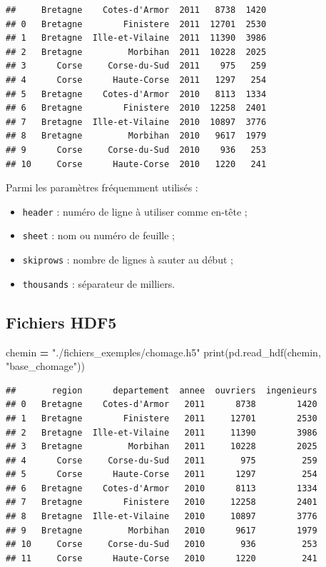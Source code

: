 \documentclass[12pt,]{book}
\newenvironment{Shaded}{\begin{snugshade}}{\end{snugshade}}
\newcommand{\StringTok}[1]{\textcolor[rgb]{0.31,0.60,0.02}{#1}}
\newcommand{\OperatorTok}[1]{\textcolor[rgb]{0.81,0.36,0.00}{\textbf{#1}}}
\newcommand{\BuiltInTok}[1]{#1}
\newcommand{\NormalTok}[1]{#1}
\providecommand{\tightlist}{%
  \setlength{\itemsep}{0pt}\setlength{\parskip}{0pt}}
\numberwithin{equation}{section}
\numberwithin{countremarque}{section}
\begin{document}
\begin{lstlisting}
##     Bretagne    Cotes-d'Armor  2011   8738  1420
## 0   Bretagne        Finistere  2011  12701  2530
## 1   Bretagne  Ille-et-Vilaine  2011  11390  3986
## 2   Bretagne         Morbihan  2011  10228  2025
## 3      Corse     Corse-du-Sud  2011    975   259
## 4      Corse      Haute-Corse  2011   1297   254
## 5   Bretagne    Cotes-d'Armor  2010   8113  1334
## 6   Bretagne        Finistere  2010  12258  2401
## 7   Bretagne  Ille-et-Vilaine  2010  10897  3776
## 8   Bretagne         Morbihan  2010   9617  1979
## 9      Corse     Corse-du-Sud  2010    936   253
## 10     Corse      Haute-Corse  2010   1220   241
\end{lstlisting}

Parmi les paramètres fréquemment utilisés :

\begin{itemize}
\tightlist
\item
  \texttt{header} : numéro de ligne à utiliser comme en-tête ;
\item
  \texttt{sheet} : nom ou numéro de feuille ;
\item
  \texttt{skiprows} : nombre de lignes à sauter au début ;
\item
  \texttt{thousands} : séparateur de milliers.
\end{itemize}

\subsection{Fichiers HDF5}\label{pandas-importation-hdf}

\begin{Shaded}
\begin{Highlighting}[]
\NormalTok{chemin }\OperatorTok{=} \StringTok{"./fichiers_exemples/chomage.h5"}
\BuiltInTok{print}\NormalTok{(pd.read_hdf(chemin, }\StringTok{"base_chomage"}\NormalTok{))}
\end{Highlighting}
\end{Shaded}

\begin{lstlisting}
##       region      departement  annee  ouvriers  ingenieurs
## 0   Bretagne    Cotes-d'Armor   2011      8738        1420
## 1   Bretagne        Finistere   2011     12701        2530
## 2   Bretagne  Ille-et-Vilaine   2011     11390        3986
## 3   Bretagne         Morbihan   2011     10228        2025
## 4      Corse     Corse-du-Sud   2011       975         259
## 5      Corse      Haute-Corse   2011      1297         254
## 6   Bretagne    Cotes-d'Armor   2010      8113        1334
## 7   Bretagne        Finistere   2010     12258        2401
## 8   Bretagne  Ille-et-Vilaine   2010     10897        3776
## 9   Bretagne         Morbihan   2010      9617        1979
## 10     Corse     Corse-du-Sud   2010       936         253
## 11     Corse      Haute-Corse   2010      1220         241
\end{lstlisting}
\end{document}
